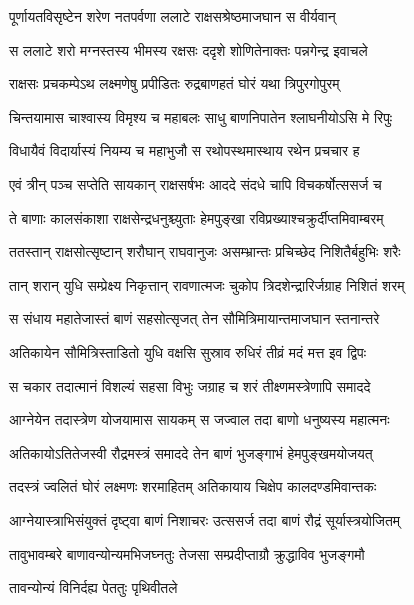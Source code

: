 \twolineshloka
{पूर्णायतविसृष्टेन शरेण नतपर्वणा}
{ललाटे राक्षसश्रेष्ठमाजघान स वीर्यवान्} %

\twolineshloka
{स ललाटे शरो मग्नस्तस्य भीमस्य रक्षसः}
{ददृशे शोणितेनाक्तः पन्नगेन्द्र इवाचले} %

\twolineshloka
{राक्षसः प्रचकम्पेऽथ लक्ष्मणेषु प्रपीडितः}
{रुद्रबाणहतं घोरं यथा त्रिपुरगोपुरम्} %

\twolineshloka
{चिन्तयामास चाश्वास्य विमृश्य च महाबलः}
{साधु बाणनिपातेन श्लाघनीयोऽसि मे रिपुः} %

\twolineshloka
{विधायैवं विदार्यास्यं नियम्य च महाभुजौ}
{स रथोपस्थमास्थाय रथेन प्रचचार ह} %

\twolineshloka
{एवं त्रीन् पञ्च सप्तेति सायकान् राक्षसर्षभः}
{आददे संदधे चापि विचकर्षोत्ससर्ज च} %

\twolineshloka
{ते बाणाः कालसंकाशा राक्षसेन्द्रधनुश्च्युताः}
{हेमपुङ्खा रविप्रख्याश्चक्रुर्दीप्तमिवाम्बरम्} %

\twolineshloka
{ततस्तान् राक्षसोत्सृष्टान् शरौघान् राघवानुजः}
{असम्भ्रान्तः प्रचिच्छेद निशितैर्बहुभिः शरैः} %

\twolineshloka
{तान् शरान् युधि सम्प्रेक्ष्य निकृत्तान् रावणात्मजः}
{चुकोप त्रिदशेन्द्रारिर्जग्राह निशितं शरम्} %

\twolineshloka
{स संधाय महातेजास्तं बाणं सहसोत्सृजत्}
{तेन सौमित्रिमायान्तमाजघान स्तनान्तरे} %

\twolineshloka
{अतिकायेन सौमित्रिस्ताडितो युधि वक्षसि}
{सुस्राव रुधिरं तीव्रं मदं मत्त इव द्विपः} %

\twolineshloka
{स चकार तदात्मानं विशल्यं सहसा विभुः}
{जग्राह च शरं तीक्ष्णमस्त्रेणापि समाददे} %

\twolineshloka
{आग्नेयेन तदास्त्रेण योजयामास सायकम्}
{स जज्वाल तदा बाणो धनुष्यस्य महात्मनः} %

\twolineshloka
{अतिकायोऽतितेजस्वी रौद्रमस्त्रं समाददे}
{तेन बाणं भुजङ्गाभं हेमपुङ्खमयोजयत्} %

\twolineshloka
{तदस्त्रं ज्वलितं घोरं लक्ष्मणः शरमाहितम्}
{अतिकायाय चिक्षेप कालदण्डमिवान्तकः} %

\twolineshloka
{आग्नेयास्त्राभिसंयुक्तं दृष्ट्वा बाणं निशाचरः}
{उत्ससर्ज तदा बाणं रौद्रं सूर्यास्त्रयोजितम्} %

\twolineshloka
{तावुभावम्बरे बाणावन्योन्यमभिजघ्नतुः}
{तेजसा सम्प्रदीप्ताग्रौ क्रुद्धाविव भुजङ्गमौ} %

\onelineshloka
{तावन्योन्यं विनिर्दह्य पेततुः पृथिवीतले} %

